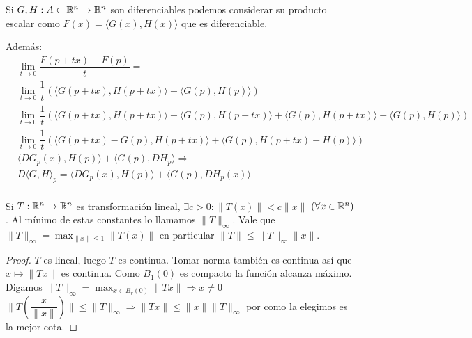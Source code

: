 \begin{note}
  Si \(G, H: A \subset \mathbb{R}^n \to \mathbb{R}^n\) son diferenciables podemos considerar su producto escalar como \(F(x) = \langle G(x), H(x) \rangle \) que es diferenciable.

  Además:
  \begin{align*}
     & \lim_{t \to 0} \dfrac{F(p + tx) - F(p)}{t} =                                                                                                                 \\
     & \lim_{t \to 0} \dfrac{1}{t} ( \langle G(p + tx), H(p+tx) \rangle - \langle G(p), H(p) \rangle )                                                              \\
     & \lim_{t \to 0} \dfrac{1}{t} ( \langle G(p+tx), H(p+tx) \rangle - \langle G(p), H(p+tx) \rangle + \langle G(p), H(p+tx) \rangle - \langle G(p), H(p) \rangle) \\
     & \lim_{t \to 0} \dfrac{1}{t} (\langle G(p+tx) - G(p), H(p + tx) \rangle + \langle G(p), H(p+tx) - H(p) \rangle)                                               \\
     & \langle DG_p(x), H(p) \rangle + \langle G(p), DH_p \rangle \Rightarrow                                                                                       \\
     & D\langle G, H \rangle_p = \langle DG_p(x), H(p) \rangle + \langle G(p), DH_p(x) \rangle                                                                      \\
  \end{align*}
\end{note}

\begin{lemma}
  Si \(T: \mathbb{R}^n \to \mathbb{R}^n\) es transformación lineal, \(\exists c > 0: \|T(x)\| < c \|x\| \) \((\forall x \in \mathbb{R}^n)\). Al mínimo de estas constantes lo llamamos \( \|T\|_{\infty} \). Vale que \( \|T\|_{\infty} = \max_{\|x\| \leq 1} \|T(x)\| \) en particular
  \( \|T\| \leq \|T\|_{\infty} \|x\| \).
  \begin{proof}
    \(T\) es lineal, luego \(T\) es continua. Tomar norma también es continua así que \(x \mapsto \|Tx\| \) es continua. Como \(\overline{B_1(0)} \) es compacto la función alcanza máximo. Digamos \( \|T\|_{\infty} = \max_{x \in B_r(0)} \|Tx\| \Rightarrow x \neq 0\) \\
    \( \|T(\dfrac{x}{\|x\|})\| \leq \|T\|_{\infty} \Rightarrow \|Tx\| \leq \|x\| \|T\|_{\infty} \) por como la elegimos es la mejor cota.
  \end{proof}
\end{lemma}

